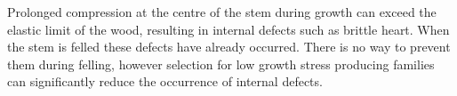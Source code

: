 Prolonged compression at the centre of the stem during growth can exceed the
elastic limit of the wood, resulting in internal defects such as brittle heart.
When the stem is felled these defects have already occurred. There is
no way to prevent them during felling, however selection for low growth stress
producing families can significantly reduce the occurrence of internal
defects.